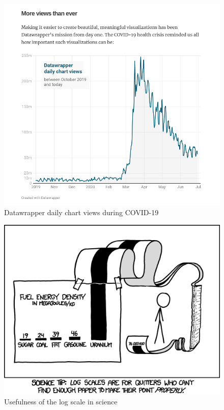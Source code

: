 \documentclass[print]{nuthesis}
\begin{document}
\begin{figure}[tbp]

{\centering \includegraphics[width=0.9\linewidth,]{images/covid19-datawrapper-views-july2020} 

}

\caption{Datawrapper daily chart views during COVID-19}\label{fig:covid19-datawrapper-views-july2020}
\end{figure}

\begin{figure}[tbp]

{\centering \includegraphics[width=0.7\linewidth,]{images/log-scale-comic} 

}

\caption{Usefulness of the log scale in science}\label{fig:log-scale-comic}
\end{figure}
\end{document}
